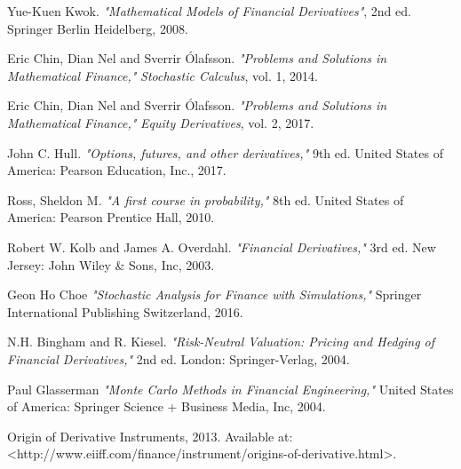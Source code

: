 \documentclass[12pt,a4paper,left=2cm,right=2cm,oneside,titlepage]{report}
\numberwithin{equation}{section}
\begin{document}
	
	
	\newpage
	\setcounter{page}{1}	
	
	
	
	
	
	
	\begin{thebibliography}{9}
		Yue-Kuen Kwok.  
		\textit{"Mathematical Models
			of Financial Derivatives"}, 2nd ed.
		Springer Berlin Heidelberg, 2008.
		
	Eric Chin, Dian Nel and Sverrir Ólafsson.  
		\textit{"Problems and Solutions
			in Mathematical Finance,"} \textit{Stochastic Calculus},
		 vol. 1, 2014. 
		
		Eric Chin, Dian Nel and Sverrir Ólafsson.  
		\textit{"Problems and Solutions
			in Mathematical Finance,"} \textit{Equity Derivatives},
		vol. 2, 2017.
		
		John C. Hull.  
		\textit{"Options, futures, and other derivatives,"} 
		9th ed. United States of
		America: Pearson Education, Inc., 2017. 

		Ross, Sheldon M.  
		\textit{"A first course in probability,"} 
		8th ed. United States of
		America: Pearson Prentice Hall, 2010. 

		Robert W. Kolb and James A. Overdahl. 
		\textit{"Financial Derivatives,"} 3rd ed. New Jersey: John Wiley \& Sons, Inc, 2003. 
		
		Geon Ho Choe 
		\textit{"Stochastic Analysis for Finance with Simulations,"} Springer International Publishing Switzerland, 2016. 
		
		N.H. Bingham and R. Kiesel.
		\textit{"Risk-Neutral Valuation: Pricing and Hedging of Financial Derivatives,"} 2nd ed. London: Springer-Verlag, 2004. 
		
		 Paul Glasserman
		\textit{"Monte Carlo Methods in Financial Engineering,"} United States of
		America: Springer Science + Business Media, Inc, 2004.
		
		Origin of Derivative Instruments, 2013. Available at: \textless http://www.eiiff.com/finance/instrument/origins-of-derivative.html\textgreater. 
	\end{thebibliography}
	\begin{appendices}
		
	\end{appendices}	
\end{document}
